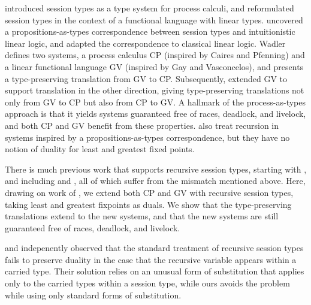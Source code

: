 \documentclass[orivec,envcountsame]{llncs}
\begin{document}
\citet{Honda93} introduced session types as a type system for process calculi, and
\citet{GayVasconcelos10} reformulated session types in the context of a functional language with
linear types. \citet{CairesPfenning10} uncovered a propositions-as-types correspondence between
session types and intuitionistic linear logic, and \citet{Wadler12} adapted the correspondence to
classical linear logic. Wadler defines two systems, a process calculus CP (inspired by Caires and
Pfenning) and a linear functional language GV (inspired by Gay and Vasconcelos), and presents a
type-preserving translation from GV to CP. Subsequently, \citet{LindleyM14} extended GV to support
translation in the other direction, giving type-preserving translations not only from GV to CP but
also from CP to GV. A hallmark of the process-as-types approach is that it yields systems guaranteed
free of races, deadlock, and livelock, and both CP and GV benefit from these properties.
\citet{Toninho13,Toninho14} also treat recursion in systems inspired by a propositions-as-types
correspondence, but they have no notion of duality for least and greatest fixed points.

There is much previous work that supports recursive session types, starting with \citet{Honda98},
and including \citet{Yoshida07} and \citet{DemangeonH11}, all of which suffer from the mismatch
mentioned above. Here, drawing on work of \citet{Baelde12}, we extend both CP and GV with recursive
session types, taking least and greatest fixpoints as duals. We show that the type-preserving
translations extend to the new systems, and that the new systems are still guaranteed free of races,
deadlock, and livelock.

\citet{Bono12} and \citet{Bernardi13} indepenently observed that the standard treatment of recursive
session types fails to preserve duality in the case that the recursive variable appears within a
carried type.  Their solution relies on an unusual form of substitution that applies only to the
carried types within a session type, while ours avoids the problem while using only standard forms
of substitution.
\end{document}
